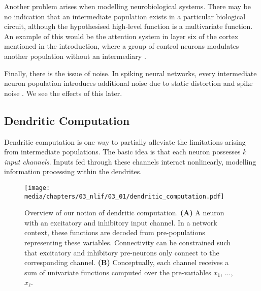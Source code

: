 Another problem arises when modelling neurobiological systems.
There may be no indication that an intermediate population exists in a particular biological circuit, although the hypothesised high-level function is a multivariate function.
An example of this would be the attention system in layer six of the cortex mentioned in the introduction, where a group of control neurons modulates another population without an intermediary \citep{bobier2014unifying}.

Finally, there is the issue of noise.
In spiking neural networks, every intermediate neuron population introduces additional noise due to static distortion and spike noise \citep[Section~2.2.2]{eliasmith2003neural}.
We see the effects of this later.

\subsection{Dendritic Computation}
\label{sec:dendritic_computation_theory_dendritic}

Dendritic computation is one way to partially alleviate the limitations arising from intermediate populations.
The basic idea is that each neuron possesses $k$ \emph{input channels}.
Inputs fed through these channels interact nonlinearly, modelling information processing within the dendrites.

\begin{figure}
	\texttt{[image: media/chapters/03\_nlif/03\_01/dendritic\_computation.pdf]}%
	{\label{fig:dendritic_computation_net}}%
	{\label{fig:dendritic_computation_fun}}%
	\caption[Overview of our notion of dendritic computation.]{Overview of our notion of dendritic computation. \textbf{(A)} A neuron with an excitatory and inhibitory input channel. In a network context, these functions are decoded from pre-populations representing these variables. Connectivity can be constrained such that excitatory and inhibitory pre-neurons only connect to the corresponding channel. \textbf{(B)} Conceptually, each channel receives a sum of univariate functions computed over the pre-variables $x_1$, $\ldots$, $x_\ell$.}
\end{figure}

